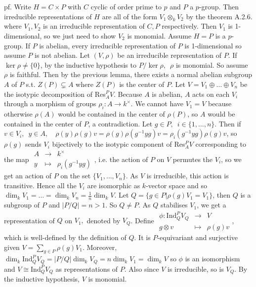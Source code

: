 \documentclass[12pt,letterpaper]{report}
\begin{document}
pf. Write $H=C\times P$ with $C$ cyclic of order prime to $p$ and $P$ a $p$-group. Then irreducible representations of $H$ are all of the form $V_{1}\otimes_{k}V_{2}$ by the theorem A.2.6. where $V_{1},V_{2}$ is an irreducible representation of $C, P$ respectively. Then $V_{1}$ is 1-dimensional, so we just need to show $V_{2}$ is monomial. Assume $H=P$ is a $p$-group. If $P$ is abelian, every irreducible representation of $P$ is 1-dimensional so assume $P$ is not abelian. Let $(V,\rho)$ be an irreducible representation of $P$. If $\ker\rho\neq\{0\}$, by the inductive hypothesis to $P/\ker\rho,\,\,\,\rho$ is monomial. So assume $\rho$ is faithful. Then by the previous lemma, there exists a normal abelian subgroup $A$ of $P$ s.t. $Z(P)\subsetneq A$ where $Z(P)$ is the center of $P$. Let $V=V_{1}\oplus\dots\oplus V_{n}$ be the isotypic decomposition of Res$_{A}^{P}V$. Because $A$ is abelian, $A$ acts on each $V_{i}$ through a morphism of groups $\rho_{i}:A\rightarrow k^{\times}$. We cannot have $V_{1}=V$ because otherwise $\rho(A)$ would be contained in the center of $\rho(P)$, so $A$ would be contained in the center of $P$, a contradiction. Let $g\in P,\,\,\,i\in\{1,\dots,n\}$. Then if $v\in V_{i},\,\,\,y\in A,\,\,\,\,\,\,\rho(y)\rho(g)v=\rho(g)\rho(g^{-1}yg)v=\rho_{i}(g^{-1}yg)\rho(g)v$, so $\rho(g)$ sends $V_{i}$ bijectively to the isotypic component of Res$_{A}^{P}V$ corresponding to the map $\begin{array}{rrr}A&\rightarrow&k^{\times}\\y&\mapsto&\rho_{i}(g^{-1}yg)\end{array}$, i.e. the action of $P$ on $V$ permutes the $V_{i}$, so we get an action of $P$ on the set $\{V_{1},\dots,V_{n}\}$. As $V$ is irreducible, this action is transitive. Hence all the $V_{i}$ are isomorphic as $k$-vector space and so $\dim_{k}V_{1}=\dots=\dim_{k}V_{n}=\frac{1}{n}\dim_{k}V$. Let $Q=\{g\in P|\rho(g)V_{1}=V_{1}\}$, then $Q$ is a subgroup of $P$ and $|P/Q|=n>1$. So $Q\neq P$. As $Q$ stabilises $V_{1}$, we get a representation of $Q$ on $V_{1},$ denoted by $V_{Q}$. Define $\begin{array}{rrr}\phi:\text{Ind}_{Q}^{P}V_{Q}&\rightarrow&V\\g\otimes v&\mapsto&\rho(g)v\end{array}$, which is well-defined by the definition of $Q$. It is $P$-equivariant and surjective given $V=\sum_{g\in P}\rho(g)V_{1}$. Moreover, $\dim_{k}\text{Ind}_{Q}^{P}V_{Q}=|P/Q|\dim_{k}V_{Q}=n\dim_{k}V_{1}=\dim_{k}V$ so $\phi$ is an isomorphism and $V\cong\text{Ind}_{Q}^{P}V_{Q}$ as representations of $P$. Also since $V$ is irreducible, so is $V_{Q}$. By the inductive hypothesis, $V$ is monomial. 
\end{document}
